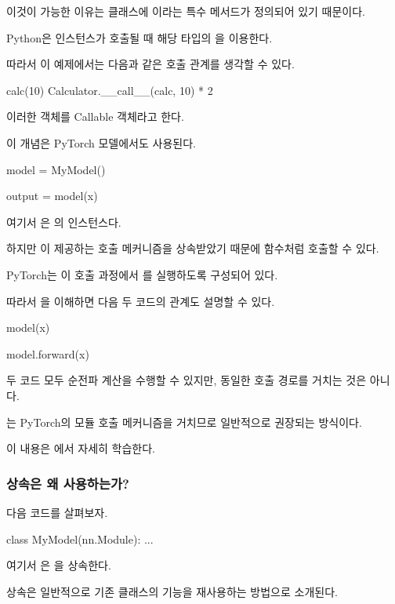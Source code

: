 이것이 가능한 이유는  클래스에 이라는 특수 메서드가 정의되어 있기 때문이다.

Python은 인스턴스가 호출될 때 해당 타입의 을 이용한다.

따라서 이 예제에서는 다음과 같은 호출 관계를 생각할 수 있다.

\begin{dhksmry}[centered]
calc(10)
\da
Calculator.__call__(calc, 10)
 * 2
\end{dhksmry}

이러한 객체를 Callable 객체라고 한다.

이 개념은 PyTorch 모델에서도 사용된다.

\begin{dhkcode}
model = MyModel()

output = model(x)
\end{dhkcode}

여기서 은 의 인스턴스다.

하지만 이 제공하는 호출 메커니즘을 상속받았기 때문에 함수처럼 호출할 수 있다.

PyTorch는 이 호출 과정에서 를 실행하도록 구성되어 있다.

따라서 을 이해하면 다음 두 코드의 관계도 설명할 수 있다.

\begin{dhkcode}
model(x)

model.forward(x)
\end{dhkcode}

두 코드 모두 순전파 계산을 수행할 수 있지만, 동일한 호출 경로를 거치는 것은 아니다.

는 PyTorch의 모듈 호출 메커니즘을 거치므로 일반적으로 권장되는 방식이다.

이 내용은 에서 자세히 학습한다.

\subsubsection{상속은 왜 사용하는가?}

다음 코드를 살펴보자.

\begin{dhkcode}
class MyModel(nn.Module):
    ...
\end{dhkcode}

여기서 은 을 상속한다.

상속은 일반적으로 기존 클래스의 기능을 재사용하는 방법으로 소개된다.

